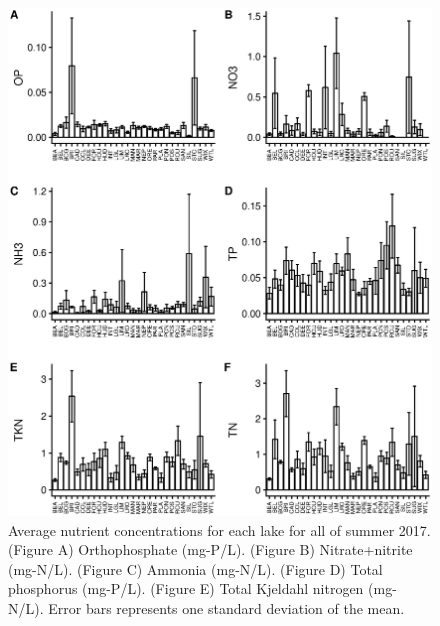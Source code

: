 \begin{figure}[!hp]
\centering
\includegraphics[width=\textwidth]{figures/nutboxplotlake}
\caption{Average nutrient concentrations for each lake for all of summer 2017. (Figure A) Orthophosphate (mg-P/L). (Figure B) Nitrate+nitrite (mg-N/L). (Figure C) Ammonia (mg-N/L). (Figure D) Total phosphorus (mg-P/L). (Figure E) Total Kjeldahl nitrogen (mg-N/L). Error bars represents one standard deviation of the mean. }
\label{fig:nutrients}
\end{figure}


